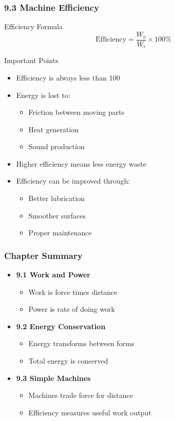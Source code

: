 \documentclass{beamer}
\begin{document}
\begin{frame}
\frametitle{9.3 Machine Efficiency}
\begin{block}{Efficiency Formula}
$$\text{Efficiency} = \frac{W_o}{W_i} \times 100\%$$
\end{block}

\begin{block}{Important Points}
\begin{itemize}
\item Efficiency is always less than 100%
\item Energy is lost to:
 \begin{itemize}
 \item Friction between moving parts
 \item Heat generation
 \item Sound production
 \end{itemize}
\item Higher efficiency means less energy waste
\item Efficiency can be improved through:
 \begin{itemize}
 \item Better lubrication
 \item Smoother surfaces
 \item Proper maintenance
 \end{itemize}
\end{itemize}
\end{block}
\end{frame}

\begin{frame}
\frametitle{Chapter Summary}
\begin{itemize}
\item \textbf{9.1 Work and Power}
  \begin{itemize}
  \item Work is force times distance
  \item Power is rate of doing work
  \end{itemize}
\item \textbf{9.2 Energy Conservation}
  \begin{itemize}
  \item Energy transforms between forms
  \item Total energy is conserved
  \end{itemize}
\item \textbf{9.3 Simple Machines}
  \begin{itemize}
  \item Machines trade force for distance
  \item Efficiency measures useful work output
  \end{itemize}
\end{itemize}
\end{frame}
\end{document}
